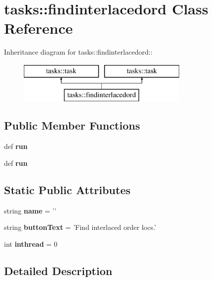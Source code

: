 \section{tasks::findinterlacedord Class Reference}
\label{classtasks_1_1findinterlacedord}
Inheritance diagram for tasks::findinterlacedord::\begin{figure}[H]
\begin{center}
\leavevmode
\includegraphics[height=2cm]{classtasks_1_1findinterlacedord}
\end{center}
\end{figure}
\subsection*{Public Member Functions}
\begin{CompactItemize}
\item 
def \textbf{run}\label{classtasks_1_1findinterlacedord_28bad17fea4f445072777c823ac9fc5b}

\item 
def \textbf{run}\label{classtasks_1_1findinterlacedord_28bad17fea4f445072777c823ac9fc5b}

\end{CompactItemize}
\subsection*{Static Public Attributes}
\begin{CompactItemize}
\item 
string \textbf{name} = '{\bffindinterlacedord}'\label{classtasks_1_1findinterlacedord_6ae93f890694bbeec91ab0dfc91108a8}

\item 
string \textbf{button\-Text} = 'Find interlaced order locs.'\label{classtasks_1_1findinterlacedord_e33974a031452ec69f27e4cf484a5d47}

\item 
int \textbf{inthread} = 0\label{classtasks_1_1findinterlacedord_559c35c33bc9aa414e9a9ef08a2e1a68}

\end{CompactItemize}


\subsection{Detailed Description}


